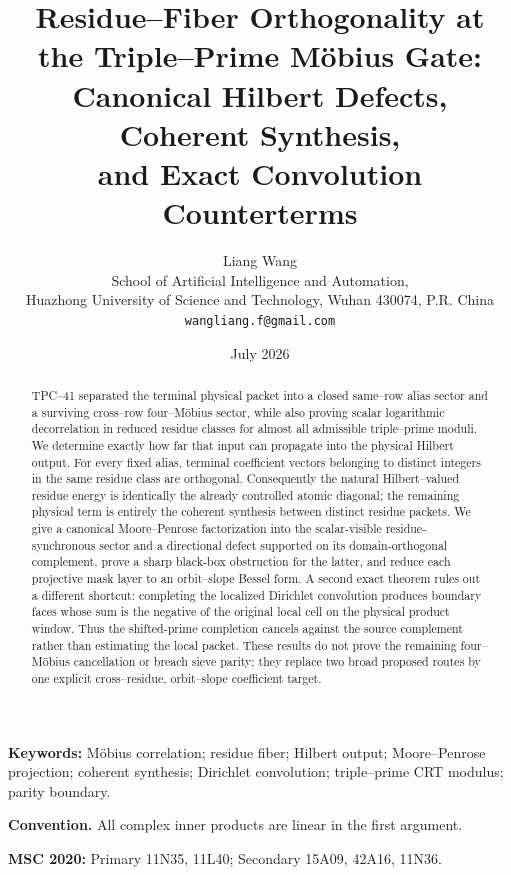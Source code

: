 \documentclass[11pt]{article}
\title{\bfseries Residue--Fiber Orthogonality at the Triple--Prime M\"obius Gate:\\
Canonical Hilbert Defects, Coherent Synthesis,\\
and Exact Convolution Counterterms}
\author{Liang Wang\\
\small School of Artificial Intelligence and Automation,\\[-2pt]
\small Huazhong University of Science and Technology, Wuhan 430074, P.R. China\\
\small \texttt{wangliang.f@gmail.com}}
\date{July 2026}
\theoremstyle{definition}
\theoremstyle{remark}
\begin{document}
\maketitle

\begin{abstract}
TPC--41 separated the terminal physical packet into a closed same--row
alias sector and a surviving cross--row four--M\"obius sector, while also
proving scalar logarithmic decorrelation in reduced residue classes for
almost all admissible triple--prime moduli.  We determine exactly how far
that input can propagate into the physical Hilbert output.  For every
fixed alias, terminal coefficient vectors belonging to distinct integers in the
same residue class are orthogonal.  Consequently the natural
Hilbert--valued residue energy is identically the already controlled atomic
diagonal; the remaining physical term is entirely the coherent synthesis
between distinct residue packets.  We give a canonical Moore--Penrose
factorization into the scalar-visible residue-synchronous sector and a
directional defect supported on its domain-orthogonal complement, prove
a sharp black-box obstruction for the latter, and reduce each projective
mask layer to an orbit--slope Bessel
form.  A second exact theorem rules out a different shortcut: completing
the localized Dirichlet convolution produces boundary faces whose sum is
the negative of the original local cell on the physical product window.
Thus the shifted-prime completion cancels against the source complement
rather than estimating the local packet.  These results do not prove the
remaining four--M\"obius cancellation or breach sieve parity; they replace
two broad proposed routes by one explicit cross--residue, orbit--slope
coefficient target.
\end{abstract}

\noindent\textbf{Keywords:} M\"obius correlation; residue fiber;
Hilbert output; Moore--Penrose projection; coherent synthesis; Dirichlet
convolution; triple--prime CRT modulus; parity boundary.

\medskip
\noindent\textbf{Convention.}
All complex inner products are linear in the first argument.

\medskip
\noindent\textbf{MSC 2020:} Primary 11N35, 11L40; Secondary 15A09,
42A16, 11N36.
















\end{document}
